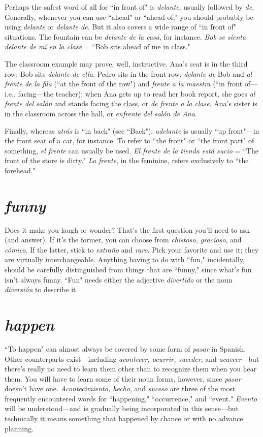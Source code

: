 Perhaps the safest word of all for ``in front of" is \emph{delante}, usually followed by \emph{de}. Generally, whenever you can use ``ahead" or
``ahead of," you should probably be using \emph{delante} or \emph{delante de}. But it
also covers a wide range of ``in front of" situations. The fountain can
be \emph{delante de la casa}, for instance. \emph{Bob se sienta delante de mí en la
clase} = ``Bob sits ahead of me in class."

The classroom example may prove, well, instructive. Ana's
seat is in the third row; Bob sits \emph{delante de ella}. Pedro sits in the front
row, \emph{delante de} Bob and \emph{al frente de la fila} (``at the front of the row")
and \emph{frente a la maestra} (``in front of---i.e., facing---the teacher); when
Ana gets up to read her book report, she goes \emph{al frente del salón} and
stands facing the class, or \emph{de frente a la clase}. Ana's sister is in the
classroom across the hall, or \emph{enfrente del salón de Ana}.

Finally, whereas \emph{atrás} is ``in back" (see ``Back"), \emph{adelante} is
usually ``up front"---in the front seat of a car, for instance. To refer to
``the front" or ``the front part" of something, \emph{el frente} can usually be
used. \emph{El frente de la tienda está sucio} = ``The front of the store is
dirty." \emph{La frente}, in the feminine, refers exclusively to ``the forehead."

\section{\emph{funny}}

Does it make you laugh or wonder? That's the first question
you'll need to ask (and answer). If it's the former, you can choose from
\emph{chistoso, gracioso}, and \emph{cómico}. If the latter, stick to \emph{extraño} and \emph{raro}.
Pick your favorite and use it; they are virtually interchangeable. Anything having to do with ``fun," incidentally, should be carefully distinguished from things that are ``funny," since what's fun isn't always
funny. ``Fun" needs either the adjective \emph{divertido} or the noun \emph{diversión} to describe it.

\section{\emph{happen}}

``To happen" can almost always be covered by some form of
\emph{pasar} in Spanish. Other counterparts exist---including \emph{acontecer, ocurrir, suceder}, and \emph{acaecer}---but there's really no need to learn them
other than to recognize them when you hear them. You will have to
learn some of their noun forms, however, since \emph{pasar} doesn't have one.
\emph{Acontecimiento, hecho}, and \emph{suceso} are three of the most frequently
encountered words for ``happening," ``occurrence," and ``event."
\emph{Evento} will be understood---and is gradually being incorporated in this
sense---but technically it means something that happened by chance
or with no advance planning.

